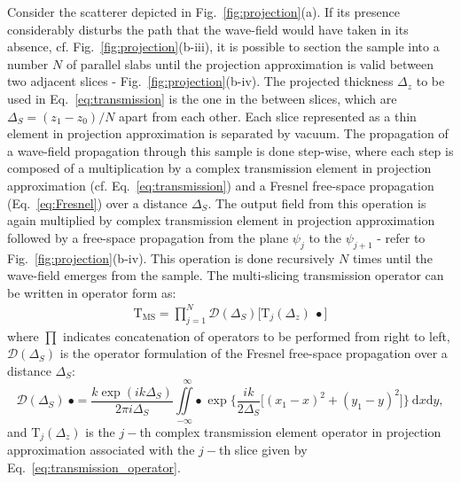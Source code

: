 \begin{refsection}
Consider the scatterer depicted in Fig.~\ref{fig:projection}(a). If its presence considerably disturbs the path that the wave-field would have taken in its absence, cf. Fig.~\ref{fig:projection}(b-$\mathrm{iii}$), it is possible to section the sample into a number $N$ of parallel slabs until the projection approximation is valid between two adjacent slices - Fig.~\ref{fig:projection}(b-$\mathrm{iv}$). The projected thickness $\Delta_z$ to be used in Eq.~\ref{eq:transmission} is the one in the between slices, which are $\Delta_S=(z_1 - z_0)/N$ apart from each other. Each slice represented as a thin element in projection approximation is separated by vacuum. The propagation of a wave-field propagation through this sample is done step-wise, where each step is composed of a multiplication by a complex transmission element in projection approximation (cf. Eq.~\ref{eq:transmission}) and a Fresnel free-space propagation (Eq.~\ref{eq:Fresnel}) over a distance $\Delta_S$. The output field from this operation is again multiplied by complex transmission element in projection approximation followed by a free-space propagation from the plane $\psi_j$ to the  $\psi_{j+1}$ - refer to Fig.~\ref{fig:projection}(b-$\mathrm{iv}$). This operation is done recursively $N$ times until the wave-field emerges from the sample. The multi-slicing transmission operator can be written in operator form as:
\begin{align}\label{eq:MS}
    \mathrm{T}_\text{MS}=\prod\limits_{j=1}^{N}\mathcal{D}(\Delta_S)\big[\mathrm{T}_j(\Delta_z)~\bullet\big]
\end{align}{}
where $\prod$ indicates concatenation of operators to be performed from right to left, $\mathcal{D}(\Delta_S)$ is the operator formulation of the Fresnel free-space propagation over a distance $\Delta_S$:
\begin{equation}\label{eq:Fresnel_operator}
    \mathcal{D}(\Delta_S)~\bullet=\frac{k\exp{(ik\Delta_S)}}{2\pi i \Delta_S}\iint\limits_{-\infty}^{\hspace{8pt}\infty}{\bullet~\exp{\Bigg\{\frac{ik}{2\Delta_S}\big[(x_1-x)^2+(y_1-y)^2 \big]\Bigg\}}~\mathrm{d}x\mathrm{d}y},
\end{equation}
and $\mathrm{T}_j(\Delta_z)$ is the $j-$th complex transmission element operator in projection approximation associated with the $j-$th slice given by Eq.~\ref{eq:transmission_operator}.


\end{refsection}
